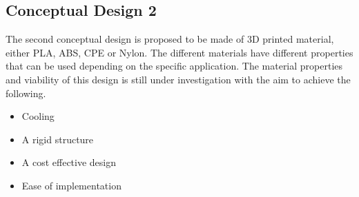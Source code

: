 \subsection{Conceptual Design 2}
The second conceptual design is proposed to be made of 3D printed material, either PLA, ABS, CPE or Nylon. The different materials have different properties that can be used depending on the specific application. The material properties and viability of this design is still under investigation with the aim to achieve the following.
\begin{itemize}
	\item Cooling
	\item A rigid structure
	\item A cost effective design
	\item Ease of implementation
\end{itemize}